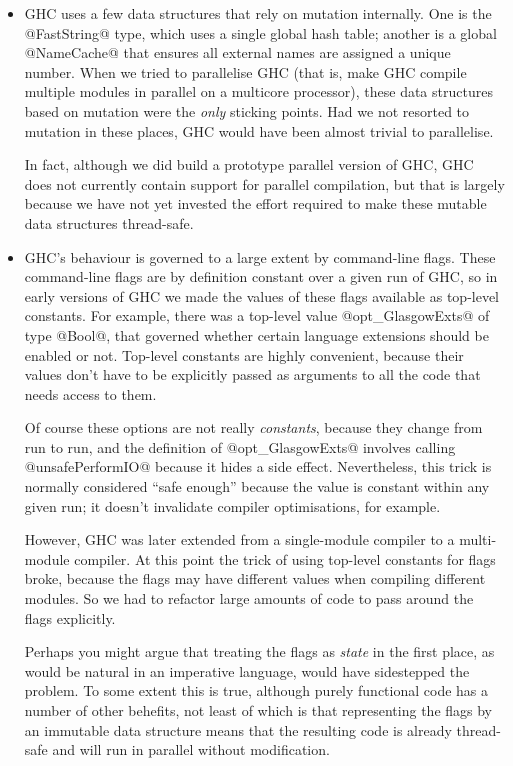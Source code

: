 \documentclass{article}
\begin{document}
{\begin{itemize}
\item GHC uses a few data structures that rely on mutation internally.
  One is the @FastString@ type, which uses a single global hash table;
  another is a global @NameCache@ that ensures all external names are
  assigned a unique number.  When we tried to parallelise GHC (that
  is, make GHC compile multiple modules in parallel on a multicore
  processor), these data structures based on mutation were the
  \emph{only} sticking points.  Had we not resorted to mutation in
  these places, GHC would have been almost trivial to parallelise.

  In fact, although we did build a prototype parallel version of GHC,
  GHC does not currently contain support for parallel compilation, but
  that is largely because we have not yet invested the effort required
  to make these mutable data structures thread-safe.

\item GHC's behaviour is governed to a large extent by command-line
  flags.  These command-line flags are by definition constant over a
  given run of GHC, so in early versions of GHC we made the values of
  these flags available as top-level constants. For example, there was
  a top-level value @opt_GlasgowExts@ of type @Bool@, that governed
  whether certain language extensions should be enabled or not.
  Top-level constants are highly convenient, because their values
  don't have to be explicitly passed as arguments to all the code that
  needs access to them.

  Of course these options are not really \emph{constants}, because
  they change from run to run, and the definition of @opt_GlasgowExts@
  involves calling @unsafePerformIO@ because it hides a side effect.
  Nevertheless, this trick is normally considered ``safe enough''
  because the value is constant within any given run; it doesn't
  invalidate compiler optimisations, for example.

  However, GHC was later extended from a single-module compiler to a
  multi-module compiler.  At this point the trick of using top-level
  constants for flags broke, because the flags may have different
  values when compiling different modules.  So we had to refactor
  large amounts of code to pass around the flags explicitly.

  Perhaps you might argue that treating the flags as \emph{state} in
  the first place, as would be natural in an imperative language,
  would have sidestepped the problem.  To some extent this is true,
  although purely functional code has a number of other behefits, not
  least of which is that representing the flags by an immutable data
  structure means that the resulting code is already thread-safe and
  will run in parallel without modification.
\end{itemize}

}
\end{document}
